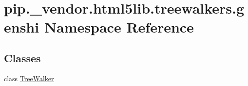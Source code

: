 \hypertarget{namespacepip_1_1__vendor_1_1html5lib_1_1treewalkers_1_1genshi}{}\section{pip.\+\_\+vendor.\+html5lib.\+treewalkers.\+genshi Namespace Reference}
\label{namespacepip_1_1__vendor_1_1html5lib_1_1treewalkers_1_1genshi}
\subsection*{Classes}
\begin{DoxyCompactItemize}
\item 
class \hyperlink{classpip_1_1__vendor_1_1html5lib_1_1treewalkers_1_1genshi_1_1TreeWalker}{Tree\+Walker}
\end{DoxyCompactItemize}
